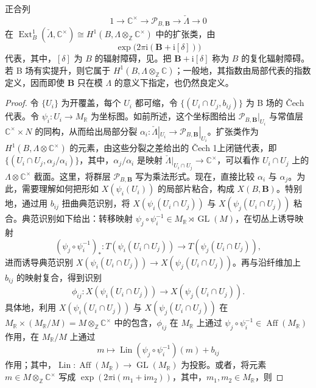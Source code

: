 \begin{proposition}\label{prop:6.59}
正合列
\[
1\longrightarrow\mathbb C^\times\longrightarrow\mathcal P_{B,\mathbf B}
\longrightarrow\check\Lambda\longrightarrow0
\]
在 $\operatorname{Ext}_B^1(\check\Lambda,\mathbb C^\times)
\cong H^1(B,\Lambda\otimes_{\mathbb Z}\mathbb C^\times)$ 中的扩张类，由
\[
\exp\bigl(2\pi\mathrm i(\mathbf B+\mathrm i[\delta])\bigr)
\]
代表，其中，$[\delta]$ 为 $B$ 的辐射障碍，见。把 $\mathbf B+\mathrm i[\delta]$ 称为 $B$ 的复化辐射障碍。若 B 场有实提升，则它属于 $H^1(B,\Lambda\otimes_{\mathbb Z}\mathbb C)$；一般地，其指数由局部代表的指数定义，因而即使 $\mathbf B$ 只在模 $\Lambda$ 的意义下指定，也仍然良定义。
\end{proposition}
\begin{proof}
令 $\{U_i\}$ 为开覆盖，每个 $U_i$ 都可缩，令 $\{(U_i\cap U_j,b_{ij})\}$ 为 B 场的 Čech 代表。令 $\psi_i\colon U_i\to M_{\mathbb R}$ 为坐标图。如前所述，这个坐标图给出 $\mathcal P_{B,\mathbf B}|_{U_i}$ 与常值层 $\mathbb C^\times\times N$ 的同构，从而给出局部分裂 $\alpha_i\colon\check\Lambda|_{U_i}\to\mathcal P_{B,\mathbf B}|_{U_i}$。扩张类作为 $H^1(B,\Lambda\otimes\mathbb C^\times)$ 的元素，由这些分裂之差给出的 Čech 1上闭链代表，即 $\{(U_i\cap U_j,\alpha_j/\alpha_i)\}$，其中，$\alpha_j/\alpha_i$ 是映射 $\check\Lambda|_{U_i\cap U_j}\to\mathbb C^\times$，可以看作 $U_i\cap U_j$ 上的 $\Lambda\otimes\mathbb C^\times$ 截面。这里，将群层 $\mathcal P_{B,\mathbf B}$ 写为乘法形式。现在，直接比较 $\alpha_i$ 与 $\alpha_j$。为此，需要理解如何把形如 $X(\psi_i(U_i))$ 的局部片粘合，构成 $X(B,\mathbf B)$。特别地，通过用 $b_{ij}$ 扭曲典范识别，将 $X(\psi_i(U_i\cap U_j))$ 与 $X(\psi_j(U_i\cap U_j))$ 粘合。典范识别如下给出：转移映射 $\psi_j\circ\psi_i^{-1}\in M_{\mathbb R}\rtimes\operatorname{GL}(M)$，在切丛上诱导映射
\[
(\psi_j\circ\psi_i^{-1})_*\colon T(\psi_i(U_i\cap U_j))
\longrightarrow T(\psi_j(U_i\cap U_j)),
\]
进而诱导典范识别 $X(\psi_i(U_i\cap U_j))\to X(\psi_j(U_i\cap U_j))$。再与沿纤维加上 $b_{ij}$ 的映射复合，得到识别
\[
\phi_{ij}\colon X(\psi_i(U_i\cap U_j))
\longrightarrow X(\psi_j(U_i\cap U_j)).
\]
具体地，利用 $X(\psi_i(U_i\cap U_j))$ 与 $X(\psi_j(U_i\cap U_j))$ 在 $M_{\mathbb R}\times(M_{\mathbb R}/M)=M\otimes_{\mathbb Z}\mathbb C^\times$ 中的包含，$\phi_{ij}$ 在 $M_{\mathbb R}$ 上通过 $\psi_j\circ\psi_i^{-1}\in\operatorname{Aff}(M_{\mathbb R})$ 作用，在 $M_{\mathbb R}/M$ 上通过
\[
m\longmapsto\operatorname{Lin}(\psi_j\circ\psi_i^{-1})(m)+b_{ij}
\]
作用；其中，$\operatorname{Lin}\colon\operatorname{Aff}(M_{\mathbb R})\to\operatorname{GL}(M_{\mathbb R})$ 为投影。或者，将元素 $m\in M\otimes_{\mathbb Z}\mathbb C^\times$ 写成 $\exp(2\pi\mathrm i(m_1+\mathrm i m_2))$，其中，$m_1,m_2\in M_{\mathbb R}$，则

\end{proof}
